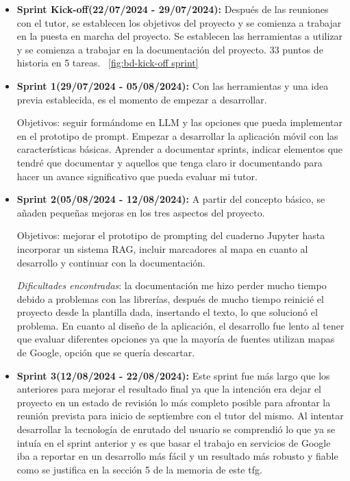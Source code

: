 \begin{itemize}
    \item \textbf{Sprint Kick-off(22/07/2024 - 29/07/2024):} Después de las reuniones con el tutor, se establecen los objetivos del proyecto y se comienza a trabajar en la puesta en marcha del proyecto. Se establecen las herramientas a utilizar y se comienza a trabajar en la documentación del proyecto. 33 puntos de historia en 5 tareas.
    ~\ref{fig:bd-kick-off sprint}
    

    \item \textbf{Sprint 1(29/07/2024 - 05/08/2024):} Con las herramientas y una idea previa establecida, es el momento de empezar a desarrollar.

    Objetivos: seguir formándome en LLM y las opciones que pueda implementar en el prototipo de prompt.
    Empezar a desarrollar la aplicación móvil con las características básicas.
    Aprender a documentar sprints, indicar elementos que tendré que documentar y aquellos que tenga claro ir documentando para hacer un avance significativo que pueda evaluar mi tutor.
    
    \item \textbf{Sprint 2(05/08/2024 - 12/08/2024):} A partir del concepto básico, se añaden pequeñas mejoras en los tres aspectos del proyecto.
    
    Objetivos: mejorar el prototipo de prompting del cuaderno Jupyter hasta incorporar un sistema RAG, incluir marcadores al mapa en cuanto al desarrollo y continuar con la documentación.
    
    \textit{Dificultades encontradas}: la documentación me hizo perder mucho tiempo debido a problemas con las librerías, después de mucho tiempo reinicié el proyecto desde la plantilla dada, insertando el texto, lo que solucionó el problema. En cuanto al diseño de la aplicación, el desarrollo fue lento al tener que evaluar diferentes opciones ya que la mayoría de fuentes utilizan mapas de Google, opción que se quería descartar.

    \item \textbf{Sprint 3(12/08/2024 - 22/08/2024):} Este sprint fue más largo que los anteriores para mejorar el resultado final ya que la intención era dejar el proyecto en un estado de revisión lo más completo posible para afrontar la reunión prevista para inicio de septiembre con el tutor del mismo. Al intentar desarrollar la tecnología de enrutado del usuario se comprendió lo que ya se intuía en el sprint anterior y es que basar el trabajo en servicios de Google iba a reportar en un desarrollo más fácil y un resultado más robusto y fiable como se justifica en la sección 5 de la memoria de este \acrshort{tfg}.
    

\end{itemize}
